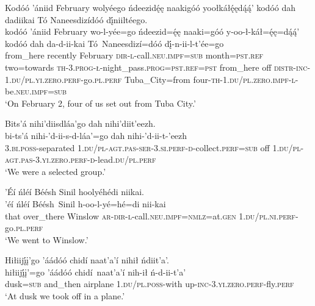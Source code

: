 \ea\label{ex:text9-1-1}
Kodóó ’ániid February wolyéego ńdeezidę́ę naakigóó yoołkáłę́ędą́ą́’ kodóó dah dadiikai Tó Naneesdizídóó dį́niiltéego.\\
\gll kodóó	’ániid	February	wo-l-yée=go	ńdeezid=ę́ę	naaki=góó	y-oo-ł-káł=ę́ę=dą́ą́’	kodóó	dah	da-d-ii-kai	Tó~{Naneesdizí=dóó}	dį́-n-ii-l-t’ée=go\\
     from\_here	recently	February	\textsc{dir}-\textsc{l}-call.\textsc{neu}.\textsc{impf}=\textsc{sub}	month=\textsc{pst}.\textsc{ref}	two=towards	\textsc{th}-3.\textsc{prog}-\textsc{ł}-night\_pass.\textsc{prog}=\textsc{pst}.\textsc{ref}=\textsc{pst}	from\_here	off	\textsc{distr}-\textsc{inc}-1.\textsc{du}/\textsc{pl}.\textsc{yi}.\textsc{zero}.\textsc{perf}-go.\textsc{pl}.\textsc{perf}	Tuba\_City=from	four-\textsc{th}-1.\textsc{du}/\textsc{pl}.\textsc{zero}.\textsc{impf}-\textsc{l}-be.\textsc{neu}.\textsc{impf}=\textsc{sub}\\
\glt `On February 2, four of us set out from Tuba City.'
\z

\ea\label{ex:text9-1-2}
Bits’á nihi’diisdláa’go dah nihi’diit’eezh.\\
\gll bi-ts’á	nihi-’d-ii-s-d-láa’=go	dah	nihi-’d-ii-t-’eezh\\
     3.\textsc{bi}.\textsc{poss}-separated	1.\textsc{du}/\textsc{pl}-\textsc{agt}.\textsc{pas}-\textsc{ser}-3.\textsc{si}.\textsc{perf}-\textsc{d}-collect.\textsc{perf}=\textsc{sub}	off	1.\textsc{du}/\textsc{pl}-\textsc{agt}.\textsc{pas}-3.\textsc{yi}.\textsc{zero}.\textsc{perf}-\textsc{d}-lead.\textsc{du}/\textsc{pl}.\textsc{perf}\\
\glt `We were a selected group.'
\z

\ea\label{ex:text9-1-3}
’Éí ńléí Béésh Sinil hoolyéhédi niikai.\\
\gll ’éí	ńléí	Béésh~{Sinil}	h-oo-l-yé=hé=di	nii-kai\\
     that	over\_there	Winslow	\textsc{ar}-\textsc{dir}-\textsc{l}-call.\textsc{neu}.\textsc{impf}=\textsc{nmlz}=at.\textsc{gen}	1.\textsc{du}/\textsc{pl}.\textsc{ni}.\textsc{perf}-go.\textsc{pl}.\textsc{perf}\\
\glt `We went to Winslow.'
\z

\ea\label{ex:text9-1-4}
Hiłiijį́į’go ’áádóó chidí naat’a’í nihił ńdiit’a’.\\
\gll hiłiijį́į’=go	’áádóó	chidí~{naat’a’í}	nih-ił	ń-d-ii-t’a’\\
     dusk=\textsc{sub}	and\_then	airplane	1.\textsc{du}/\textsc{pl}.\textsc{poss}-with	up-\textsc{inc}-3.\textsc{yi}.\textsc{zero}.\textsc{perf}-fly.\textsc{perf}\\
\glt `At dusk we took off in a plane.'
\z

